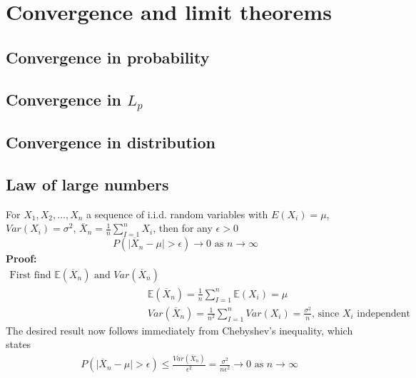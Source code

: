 \documentclass{article}
\newcommand{\abs}[1]{\lvert#1\rvert}
\begin{document}
\section{Convergence and limit theorems}
\subsection{Convergence in probability}
\subsection{Convergence in $L_p$}
\subsection{Convergence in distribution}

\subsection{Law of large numbers}
For $X_1, X_2, \dots, X_n$ a sequence of i.i.d. random variables with $E(X_i) = \mu$,  $Var(X_i) = \sigma^2$, $\overline{X}_n = \frac{1}{n}\sum_{I = 1}^n X_i$, then for any $\epsilon > 0$
\begin{equation*}
	P(\abs{\overline{X}_n - \mu} > \epsilon) \longrightarrow 0 \textrm{ as } n \rightarrow \infty
\end{equation*}
\textbf{Proof:}
\begin{align*}
	\textrm{First find $\mathbb{E}(\overline{X}_n)$ and $Var(\overline{X}_n)$} \\
	& \mathbb{E}(\overline{X}_n) = \frac{1}{n}\sum_{I = 1}^n \mathbb{E}(X_i) = \mu \\
	& Var(\overline{X}_n) = \frac{1}{n^2}\sum_{I = 1}^nVar(X_i) = \frac{\sigma^2}{n} \textrm{, since $X_i$ independent}
\end{align*}
The desired result now follows immediately from Chebyshev’s inequality, which states
\begin{align*}
	& P(\abs{\overline{X}_n - \mu} > \epsilon) \leq \frac{Var(\overline{X}_n)}{\epsilon^2} = \frac{\sigma^2}{n\epsilon^2} \rightarrow 0 \textrm{ as } n \rightarrow \infty
\end{align*}
\end{document}
